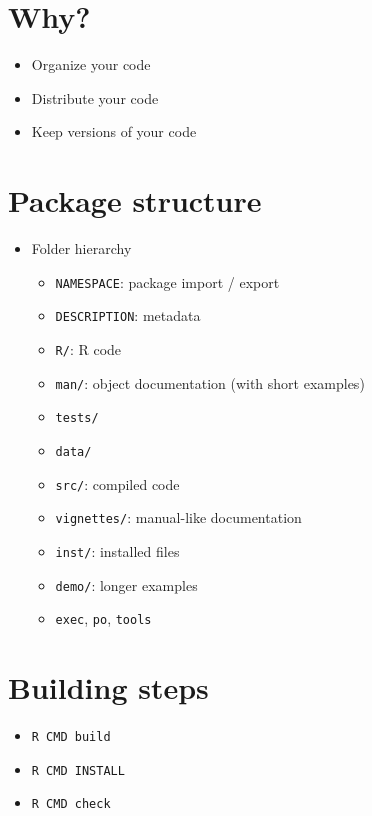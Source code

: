 \documentclass[]{book}
\providecommand{\tightlist}{%
  \setlength{\itemsep}{0pt}\setlength{\parskip}{0pt}}
\theoremstyle{definition}
\theoremstyle{definition}
\theoremstyle{definition}
\theoremstyle{remark}
\begin{document}
\section{Why?}\label{why}

\begin{itemize}
\item
  Organize your code
\item
  Distribute your code
\item
  Keep versions of your code
\end{itemize}

\section{Package structure}\label{package-structure}

\begin{itemize}
\tightlist
\item
  Folder hierarchy

  \begin{itemize}
  \tightlist
  \item
    \texttt{NAMESPACE}: package import / export
  \item
    \texttt{DESCRIPTION}: metadata
  \item
    \texttt{R/}: R code
  \item
    \texttt{man/}: object documentation (with short examples)
  \item
    \texttt{tests/}
  \item
    \texttt{data/}
  \item
    \texttt{src/}: compiled code
  \item
    \texttt{vignettes/}: manual-like documentation
  \item
    \texttt{inst/}: installed files
  \item
    \texttt{demo/}: longer examples
  \item
    \texttt{exec}, \texttt{po}, \texttt{tools}
  \end{itemize}
\end{itemize}

\section{Building steps}\label{building-steps}

\begin{itemize}
\item
  \texttt{R\ CMD\ build}
\item
  \texttt{R\ CMD\ INSTALL}
\item
  \texttt{R\ CMD\ check}
\end{itemize}
\end{document}
